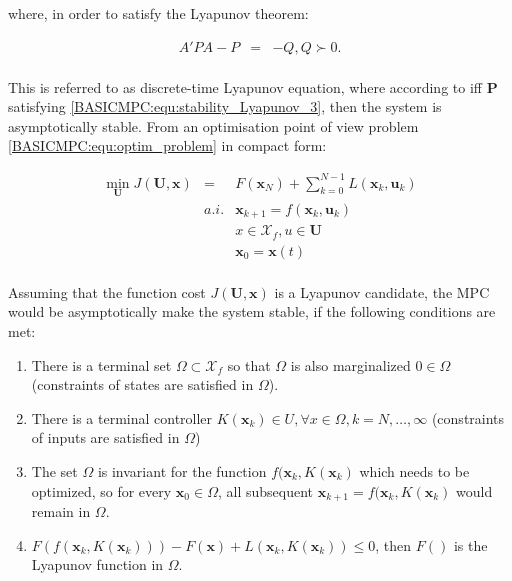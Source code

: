 		where, in order to satisfy the Lyapunov theorem:
		
		\begin{equation}
        \begin{array}{rcl}
				A'PA-P&=&-Q, Q\succ 0.\\
        \end{array}
        \label{BASICMPC:equ:stability_Lyapunov_3}
    \end{equation}
		
	This is referred to as discrete-time Lyapunov equation, where  according to \cite{borrelli2017predictive} iff $\textbf{P}$ satisfying \ref{BASICMPC:equ:stability_Lyapunov_3}, then the system is asymptotically stable. From an optimisation point of view problem \ref{BASICMPC:equ:optim_problem} in compact form:
	
\begin{equation}
        \begin{array}{rcl}
				\min_{\textbf{U}}J(\textbf{U},\textbf{x})&=&F(\textbf{x}_N)+\sum^{N-1}_{k=0}L(\textbf{x}_k,\textbf{u}_k)\\
					&a.i.&\textbf{x}_{k+1}=f(\textbf{x}_k,\textbf{u}_k) \\
					&&x\in \mathcal{X}_f, u\in \textbf{U}\\
					&&\textbf{x}_0=\textbf{x}(t)\\
        \end{array}
        \label{BASICMPC:equ:optim_stability}
    \end{equation}

Assuming that the function cost $J(\textbf{U},\textbf{x})$ is a Lyapunov candidate, the MPC would be asymptotically make the system stable, if the following conditions are met:
\begin{enumerate}
	\item There is a terminal set $\Omega\subset \mathcal{X}_f$ so that $\Omega$ is also marginalized $0\in\Omega$ (constraints of states are satisfied in $\Omega$).
	\item There is a terminal controller $K(\textbf{x}_k)\in U, \forall x\in\Omega,k=N,\dots,\infty$ (constraints of inputs are satisfied in $\Omega$)
	\item The set $\Omega$ is invariant for the function $f(\textbf{x}_k,K(\textbf{x}_k)$ which needs to be optimized, so for every $\textbf{x}_0\in\Omega$, all subsequent $\textbf{x}_{k+1}=f(\textbf{x}_k,K(\textbf{x}_k)$ would remain in $\Omega$.
	\item $F(f(\textbf{x}_k,K(\textbf{x}_k)))-F(\textbf{x})+L(\textbf{x}_k,K(\textbf{x}_k))\leq 0$, then $F()$ is the Lyapunov function in $\Omega$.
\end{enumerate}

